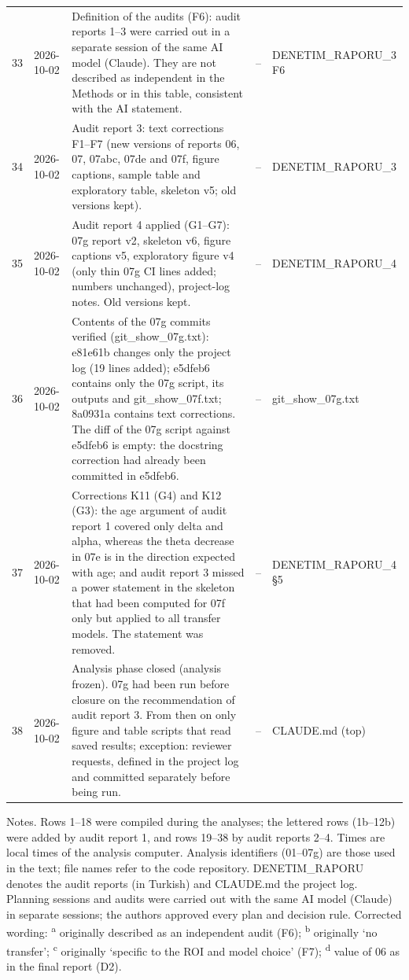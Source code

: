 \begin{longtable}{@{}p{0.6cm}p{1.9cm}p{6.8cm}p{2.8cm}p{2.3cm}@{}}
33 & 2026-10-02 & Definition of the audits (F6): audit reports 1--3 were carried out in a separate session of the same AI model (Claude). They are not described as independent in the Methods or in this table, consistent with the AI statement. & -- & DENETIM\_RAPORU\_3 F6 \\
34 & 2026-10-02 & Audit report 3: text corrections F1--F7 (new versions of reports 06, 07, 07abc, 07de and 07f, figure captions, sample table and exploratory table, skeleton v5; old versions kept). & -- & DENETIM\_RAPORU\_3 \\
35 & 2026-10-02 & Audit report 4 applied (G1--G7): 07g report v2, skeleton v6, figure captions v5, exploratory figure v4 (only thin 07g CI lines added; numbers unchanged), project-log notes. Old versions kept. & -- & DENETIM\_RAPORU\_4 \\
36 & 2026-10-02 & Contents of the 07g commits verified (git\_show\_07g.txt): e81e61b changes only the project log (19 lines added); e5dfeb6 contains only the 07g script, its outputs and git\_show\_07f.txt; 8a0931a contains text corrections. The diff of the 07g script against e5dfeb6 is empty: the docstring correction had already been committed in e5dfeb6. & -- & git\_show\_07g.txt \\
37 & 2026-10-02 & Corrections K11 (G4) and K12 (G3): the age argument of audit report 1 covered only delta and alpha, whereas the theta decrease in 07e is in the direction expected with age; and audit report 3 missed a power statement in the skeleton that had been computed for 07f only but applied to all transfer models. The statement was removed. & -- & DENETIM\_RAPORU\_4 \S{}5 \\
38 & 2026-10-02 & Analysis phase closed (analysis frozen). 07g had been run before closure on the recommendation of audit report 3. From then on only figure and table scripts that read saved results; exception: reviewer requests, defined in the project log and committed separately before being run. & -- & CLAUDE.md (top) \\
\end{longtable}
\vspace{-0.5\baselineskip}
{\scriptsize\noindent Notes. Rows 1--18 were compiled during the analyses; the lettered rows (1b--12b) were added by audit report 1, and rows 19--38 by audit reports 2--4. Times are local times of the analysis computer. Analysis identifiers (01--07g) are those used in the text; file names refer to the code repository. DENETIM\_RAPORU denotes the audit reports (in Turkish) and CLAUDE.md the project log. Planning sessions and audits were carried out with the same AI model (Claude) in separate sessions; the authors approved every plan and decision rule. Corrected wording: \textsuperscript{a} originally described as an independent audit (F6); \textsuperscript{b} originally `no transfer'; \textsuperscript{c} originally `specific to the ROI and model choice' (F7); \textsuperscript{d} value of 06 as in the final report (D2).\par}
\endgroup
